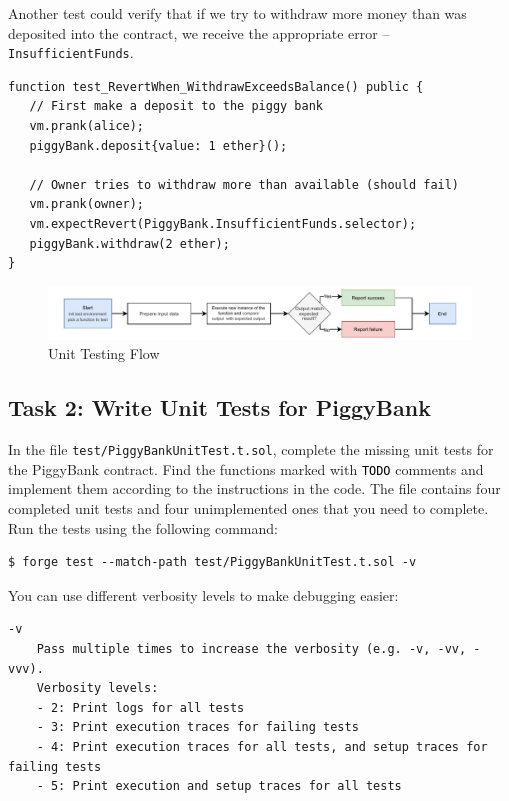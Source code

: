 \documentclass[12pt]{article}
\newcommand{\codegrey}[1]{%
  \texttt{\colorbox{black!4}{\textcolor{black}{#1}}}%
}
\begin{document}
\noindent
Another test could verify that if we try to withdraw more money than was deposited into the contract, we receive the appropriate error -- \texttt{InsufficientFunds}.

\noindent \begin{minipage}{\textwidth}
    \begin{lstlisting}[language=Solidity]
function test_RevertWhen_WithdrawExceedsBalance() public {
   // First make a deposit to the piggy bank
   vm.prank(alice);
   piggyBank.deposit{value: 1 ether}();

   // Owner tries to withdraw more than available (should fail)
   vm.prank(owner);
   vm.expectRevert(PiggyBank.InsufficientFunds.selector);
   piggyBank.withdraw(2 ether);
}
\end{lstlisting}
\end{minipage}

\begin{figure}[h!]
    \centering
    \includegraphics[width=1\textwidth]{unit-testing.pdf}
    \caption{Unit Testing Flow}\label{fig:unit-testing}
\end{figure}

\subsection*{Task 2: Write Unit Tests for PiggyBank}

In the file \texttt{test/PiggyBankUnitTest.t.sol}, complete the missing unit
tests for the PiggyBank contract. Find the functions marked with
\codegrey{TODO} comments and implement them according to the instructions in
the code. The file contains four completed unit tests and four unimplemented
ones that you need to complete. Run the tests using the following command:

\noindent \begin{minipage}{\textwidth}
    \begin{verbatim}
$ forge test --match-path test/PiggyBankUnitTest.t.sol -v
\end{verbatim}
\end{minipage}

\noindent
You can use different verbosity levels to make debugging easier:

\noindent \begin{minipage}{\textwidth}
    \begin{verbatim}
-v
    Pass multiple times to increase the verbosity (e.g. -v, -vv, -vvv).
    Verbosity levels:
    - 2: Print logs for all tests
    - 3: Print execution traces for failing tests
    - 4: Print execution traces for all tests, and setup traces for failing tests
    - 5: Print execution and setup traces for all tests
\end{verbatim}
\end{minipage}
\end{document}
